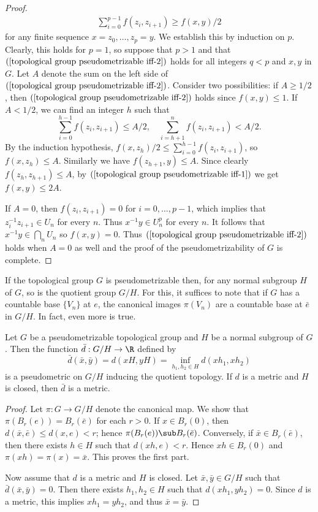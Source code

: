 \begin{proof}
\begin{align}
\sum_{i=0}^{p-1}f(z_i,z_{i+1})\geq f(x,y)/2
\end{align}
for any finite sequence $x=z_0,\dots,z_p=y$. We establish this by induction on $p$. Clearly, this holds for $p=1$, so suppose that $p>1$ and that $(\ref{topological group pseudometrizable iff-2})$ holds for all integers $q<p$ and $x,y$ in $G$. Let $A$ denote the sum on the left side of $(\ref{topological group pseudometrizable iff-2})$. Consider two possibilities: if $A\geq 1/2$, then $(\ref{topological group pseudometrizable iff-2})$ holds since $f(x,y)\leq 1$. If $A<1/2$, we can find an integer $h$ such that
\[\sum_{i=0}^{h-1}f(z_i,z_{i+1})\leq A/2,\quad \sum_{i=h+1}^{n}f(z_i,z_{i+1})<A/2.\]
By the induction hypothesis, $f(x,z_h)/2\leq\sum_{i=0}^{h-1}f(z_i,z_{i+1})$, so $f(x,z_h)\leq A$. Similarly we have $f(z_{h+1},y)\leq A$. Since clearly $f(z_h,z_{h+1})\leq A$, by $(\ref{topological group pseudometrizable iff-1})$ we get $f(x,y)\leq 2A$.\par
If $A=0$, then $f(z_i,z_{i+1})=0$ for $i=0,\dots,p-1$, which implies that $z_i^{-1}z_{i+1}\in U_n$ for every $n$. Thus $x^{-1}y\in U_n^p$ for every $n$. It follows that $x^{-1}y\in\bigcap_nU_n$ so $f(x,y)=0$. Thus $(\ref{topological group pseudometrizable iff-2})$ holds when $A=0$ as well and the proof of the pseudometrizability of $G$ is complete.
\end{proof}
If the topological group $G$ is pseudometrizable then, for any normal subgroup $H$ of $G$, so is the quotient group $G/H$. For this, it suffices to note that if $G$ has a countable base $\{V_n\}$ at $e$, the canonical images $\pi(V_n)$ are a countable base at $\bar{e}$ in $G/H$. In fact, even more is true.
\begin{proposition}\label{topological group metric on quotient}
Let $G$ be a pseudometrizable topological group and $H$ be a normal subgroup of $G$. Then the function $\bar{d}:G/H\to\R$ defined by
\[\bar{d}(\bar{x},\bar{y})=d(xH,yH)=\inf_{h_1,h_2\in H}d(xh_1,xh_2)\]
is a pseudometric on $G/H$ inducing the quotient topology. If $d$ is a metric and $H$ is closed, then $\bar{d}$ is a metric.
\end{proposition}
\begin{proof}
Let $\pi:G\to G/H$ denote the canonical map. We show that $\pi(B_r(e))=B_r(\bar{e})$ for each $r>0$. If $x\in B_r(0)$, then $d(\bar{x},\bar{e})\leq d(x,e)<r$; hence $\pi(B_r(e))\sub B_r(\bar{e})$. Conversely, if $\bar{x}\in B_r(\bar{e})$, then there exists $h\in H$ such that $d(xh,e)<r$. Hence $xh\in B_r(0)$ and $\pi(xh)=\pi(x)=\bar{x}$. This proves the first part.\par
Now assume that $d$ is a metric and $H$ is closed. Let $\bar{x},\bar{y}\in G/H$ such that $\bar{d}(\bar{x},\bar{y})=0$. Then there exists $h_1,h_2\in H$ such that $d(xh_1,yh_2)=0$. Since $d$ is a metric, this implies $xh_1=yh_2$, and thus $\bar{x}=\bar{y}$. 
\end{proof}
